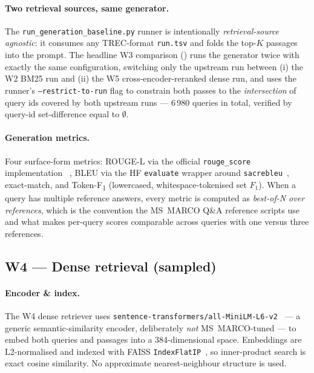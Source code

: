 \documentclass[11pt,a4paper]{article}
\newcommand{\fdev}{6\,980}
\newcommand{\msmarco}{MS~MARCO}
\newcommand{\F}{F\textsubscript{1}}
\newcommand{\Tokenf}{Token-\F}
\newcommand{\rougel}{ROUGE-L}
\newcommand{\bmtwofive}{BM25}
\begin{document}
\paragraph{Two retrieval sources, same generator.}  The
\texttt{run\_generation\_baseline.py} runner is intentionally
\emph{retrieval-source agnostic}: it consumes any TREC-format
\texttt{run.tsv} and folds the top-$K$ passages into the prompt.
The headline W3 comparison () runs the
generator twice with exactly the same configuration, switching only
the upstream run between (i) the W2 \bmtwofive{} run and (ii) the W5
cross-encoder-reranked dense run, and uses the runner's
\texttt{--restrict-to-run} flag to constrain both passes to the
\emph{intersection} of query ids covered by both upstream runs ---
\fdev{} queries in total, verified by query-id set-difference equal
to $\emptyset$.

\paragraph{Generation metrics.}  Four surface-form metrics: \rougel{}
via the official \texttt{rouge\_score} implementation
~\cite{lin2004rouge}, BLEU via the HF \texttt{evaluate} wrapper
around \texttt{sacrebleu}~\cite{papineni2002bleu}, exact-match, and
\Tokenf{} (lowercased, whitespace-tokenised set $F_1$).  When a
query has multiple reference answers, every metric is computed as
\emph{best-of-N over references}, which is the convention the
\msmarco{} Q\&A reference scripts use and what makes per-query
scores comparable across queries with one versus three references.

\subsection{W4 --- Dense retrieval (sampled)}
\label{sec:w4}

\paragraph{Encoder \& index.}  The W4 dense retriever uses
\texttt{sentence-transformers/all-MiniLM-L6-v2}~\cite{reimers2019sbert,wang2020minilm}
--- a generic semantic-similarity encoder, deliberately
\emph{not} \msmarco{}-tuned --- to embed both queries and passages
into a 384-dimensional space.  Embeddings are L2-normalised and
indexed with FAISS \texttt{IndexFlatIP}~\cite{johnson2019faiss}, so
inner-product search is exact cosine similarity.  No approximate
nearest-neighbour structure is used.
\end{document}

